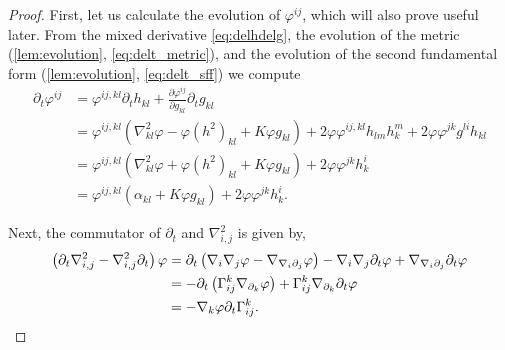 \documentclass{amsart}
\begin{document}
\begin{proof}
First, let us calculate the evolution of \(\varphi^{ij}\), which will also prove useful later. From the mixed derivative \cref{eq:delhdelg}, the evolution of the metric (\cref{lem:evolution}, \cref{eq:delt_metric}), and the evolution of the second fundamental form (\cref{lem:evolution}, \cref{eq:delt_sff}) we compute
\begin{equation}
\label{eq:deltBox}
\begin{split}
\partial_{t} \varphi^{ij} &= \varphi^{ij,kl} \partial_t h_{kl} + \frac{\partial\varphi^{ij}}{\partial g_{kl}} \partial_t g_{kl} \\
&= \varphi^{ij,kl} \left(\nabla^2_{kl} \varphi - \varphi(h^2)_{kl} + K \varphi g_{kl}\right) + 2\varphi \varphi^{ij,kl} h_{lm}h^{m}_{k} + 2\varphi\varphi^{jk}g^{li}h_{kl} \\
&= \varphi^{ij,kl} \left(\nabla^2_{kl} \varphi + \varphi(h^2)_{kl} + K \varphi g_{kl}\right) + 2\varphi\varphi^{jk}h^{i}_{k} \\
&= \varphi^{ij,kl} \left(\alpha_{kl} + K \varphi g_{kl}\right) + 2\varphi\varphi^{jk}h^{i}_{k}.
\end{split}
\end{equation}

Next, the commutator of \(\partial_t\) and \(\nabla^2_{i,j}\) is given by,
\begin{equation}
\label{eq:deltnabla2}
\begin{split}
\left(\partial_{t}\nabla^2_{i,j} - \nabla^2_{i,j}\partial_{t}\right) \varphi &= \partial_t \left(\nabla_i \nabla_j \varphi - \nabla_{\nabla_i \partial_j} \varphi\right) - \nabla_i \nabla_j \partial_t \varphi + \nabla_{\nabla_i \partial_j} \partial_t \varphi \\
&= - \partial_t \left(\Gamma_{ij}^k \nabla_{\partial_k} \varphi\right) + \Gamma_{ij}^k \nabla_{\partial_k} \partial_t \varphi \\
&= - \nabla_k \varphi \partial_t \Gamma_{ij}^k.
\end{split}
\end{equation}


\end{proof}
\end{document}
